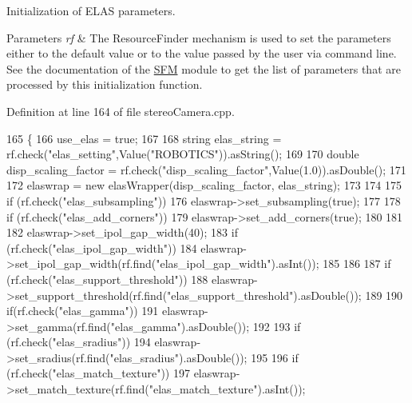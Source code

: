 Initialization of E\+L\+AS parameters. 


\begin{DoxyParams}{Parameters}
{\em rf} & The Resource\+Finder mechanism is used to set the parameters either to the default value or to the value passed by the user via command line. See the documentation of the \hyperlink{group__SFM}{S\+FM} module to get the list of parameters that are processed by this initialization function. \\
\hline
\end{DoxyParams}


Definition at line 164 of file stereo\+Camera.\+cpp.


\begin{DoxyCode}
165 \{
166     use\_elas = \textcolor{keyword}{true};
167 
168     \textcolor{keywordtype}{string} elas\_string = rf.check(\textcolor{stringliteral}{"elas\_setting"},Value(\textcolor{stringliteral}{"ROBOTICS"})).asString();
169 
170     \textcolor{keywordtype}{double} disp\_scaling\_factor = rf.check(\textcolor{stringliteral}{"disp\_scaling\_factor"},Value(1.0)).asDouble();
171 
172     elaswrap = \textcolor{keyword}{new} elasWrapper(disp\_scaling\_factor, elas\_string);
173 
174 
175     \textcolor{keywordflow}{if} (rf.check(\textcolor{stringliteral}{"elas\_subsampling"}))
176         elaswrap->set\_subsampling(\textcolor{keyword}{true});
177 
178     \textcolor{keywordflow}{if} (rf.check(\textcolor{stringliteral}{"elas\_add\_corners"}))
179         elaswrap->set\_add\_corners(\textcolor{keyword}{true});
180 
181 
182     elaswrap->set\_ipol\_gap\_width(40);
183     \textcolor{keywordflow}{if} (rf.check(\textcolor{stringliteral}{"elas\_ipol\_gap\_width"}))
184         elaswrap->set\_ipol\_gap\_width(rf.find(\textcolor{stringliteral}{"elas\_ipol\_gap\_width"}).asInt());
185 
186 
187     \textcolor{keywordflow}{if} (rf.check(\textcolor{stringliteral}{"elas\_support\_threshold"}))
188         elaswrap->set\_support\_threshold(rf.find(\textcolor{stringliteral}{"elas\_support\_threshold"}).asDouble());
189 
190     \textcolor{keywordflow}{if}(rf.check(\textcolor{stringliteral}{"elas\_gamma"}))
191         elaswrap->set\_gamma(rf.find(\textcolor{stringliteral}{"elas\_gamma"}).asDouble());
192 
193     \textcolor{keywordflow}{if} (rf.check(\textcolor{stringliteral}{"elas\_sradius"}))
194         elaswrap->set\_sradius(rf.find(\textcolor{stringliteral}{"elas\_sradius"}).asDouble());
195 
196     \textcolor{keywordflow}{if} (rf.check(\textcolor{stringliteral}{"elas\_match\_texture"}))
197         elaswrap->set\_match\_texture(rf.find(\textcolor{stringliteral}{"elas\_match\_texture"}).asInt());

\end{DoxyCode}

